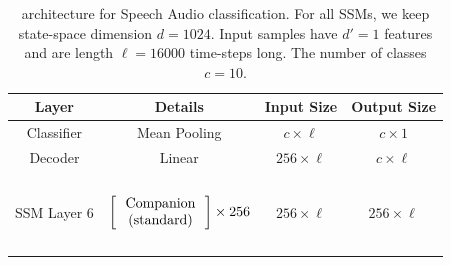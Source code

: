 \begin{table}[]
\centering
\caption{\ourmethod{} architecture for Speech Audio classification. For all SSMs, we keep state-space dimension $d = 1024$. Input samples have $d' = 1$ features and are length $\ell = 16000$ time-steps long. The number of classes $c = 10$.}
\label{tab:spacetime_speech}
\begin{tabular}{@{}c|c|c|c@{}}
Layer       & Details                                                                                                                                                                                                                                                                                                        & Input Size                              & Output Size                             \\ \midrule
Classifier  & Mean Pooling                                                                                                                                                                                                                                                                                                   & \cellcolor[HTML]{FFFFFF}$c \times \ell$ & $c \times 1$                            \\ \midrule
Decoder     & Linear                                                                                                                                                                                                                                                                                                         & $256 \times \ell$                       & \cellcolor[HTML]{FFFFFF}$c \times \ell$ \\ \midrule
SSM Layer 6 & \begin{math}\begin{aligned}    \begin{matrix}    \text{\phantom{-}} \\    \end{matrix}    \\    \begin{bmatrix}    \text{\phantom{-} Companion \phantom{-}}   \\ \text{(standard)} \\    \end{bmatrix}    \times 256     \\    \begin{matrix}    \text{\phantom{-}} \\    \end{matrix}    \\\end{aligned}\end{math} & $256 \times \ell$                       & $256 \times \ell$                       \\ \midrule

\end{tabular}
\end{table}
